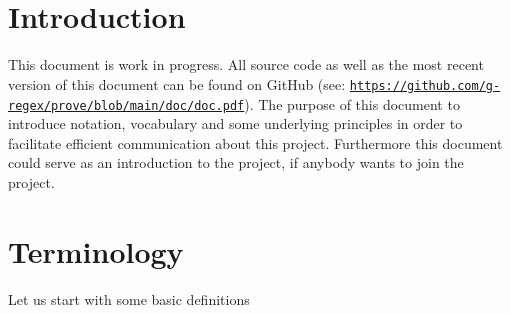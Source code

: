 \documentclass[british]{article}
\title{\name\ }
\begin{document}
\maketitle

\section{Introduction}

This document is work in progress. All source code as well as the most recent
version of this document can be found on GitHub (see:
\href{https://github.com/g-regex/prove/blob/main/doc/doc.pdf}%
{\texttt{https://github.com/g-regex/prove/blob/main/doc/doc.pdf}}). The purpose
of this document to introduce notation, vocabulary and some underlying
principles in order to facilitate efficient communication about this project.
Furthermore this document could serve as an introduction to the project, if
anybody wants to join the project.

\pagebreak{}

\section{Terminology}

Let us start with some basic definitions
\end{document}
